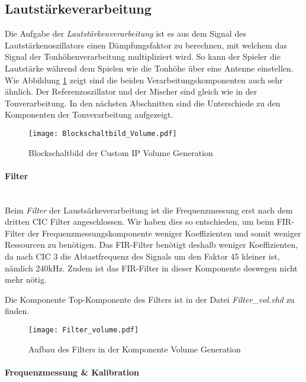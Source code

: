 \subsection{Lautstärkeverarbeitung}\label{subsec:Volume_Generation}
Die Aufgabe der \textit{Lautstärkenverarbeitung} ist es aus dem Signal des Lautstärkenoszillators einen Dämpfungsfaktor zu berechnen, mit welchem das Signal der Tonhöhenverarbeitung multipliziert wird. So kann der Spieler die Lautstärke während dem Spielen wie die Tonhöhe über eine Antenne einstellen. Wie Abbildung \ref{img:Blockschaltbild_volume} zeigt sind die beiden Verarbeitungskomponenten auch sehr ähnlich. Der Referenzoszillator und der Mischer sind gleich wie in der Tonverarbeitung. In den nächsten Abschnitten sind die Unterschiede zu den Komponenten der Tonverarbeitung aufgezeigt.



\begin{figure}[h!]
	\centering
	\texttt{[image: Blockschaltbild\_Volume.pdf]}
	\caption{Blockschaltbild der Custom IP Volume Generation} 
	\label{img:Blockschaltbild_volume}
\end{figure}  


\newpage
\paragraph{Filter}\mbox{}\\

Beim \textit{Filter} der Laustsärkeverarbeitung ist die Frequenzmessung erst nach dem dritten CIC Filter angeschlossen. Wir haben dies so entschieden, um beim FIR-Filter der Frequenzmessungskomponente weniger Koeffizienten und somit weniger Ressourcen zu benötigen. Das FIR-Filter benötigt deshalb weniger Koeffizienten, da nach CIC 3 die Abtastfrequenz des Signals um den Faktor 45 kleiner ist, nämlich 240kHz. Zudem ist das FIR-Filter in dieser Komponente deswegen nicht mehr nötig.

Die Komponente Top-Komponente des Filters ist in der Datei \textit{Filter\_vol.vhd} zu finden.

\begin{figure}[h!]
	\centering
	\texttt{[image: Filter\_volume.pdf]}
	\caption{Aufbau des Filters in der Komponente Volume Generation} 
	\label{img:Filter_Volume}
\end{figure}  

\paragraph{Frequenzmessung \& Kalibration}\mbox{}\\

